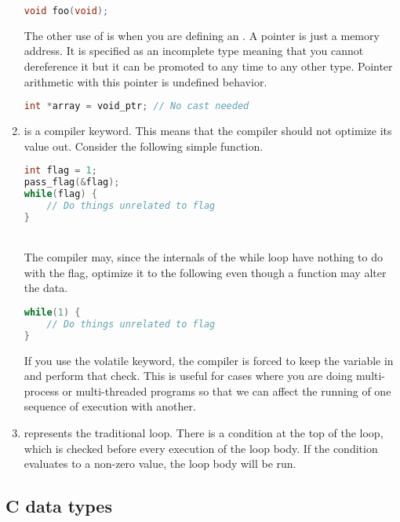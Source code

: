 \begin{enumerate}
	      \begin{lstlisting}[language=C]
void foo(void);
\end{lstlisting}


	      The other use of  is when you are defining an .
        A  pointer is just a memory address. It is specified as an incomplete type meaning that you cannot dereference it but it can be promoted to any time to any other type. Pointer arithmetic with this pointer is undefined behavior.

	      \begin{lstlisting}[language=C]
int *array = void_ptr; // No cast needed
\end{lstlisting}

	    \item {} is a compiler keyword.
        This means that the compiler should not optimize its value out.
        Consider the following simple function.
	      \\
	      \begin{lstlisting}[language=C]
int flag = 1;
pass_flag(&flag);
while(flag) {
    // Do things unrelated to flag
}
\end{lstlisting}
	      \\
	      The compiler may, since the internals of the while loop have nothing to do with the flag, optimize it to the following even though a function may alter the data.
	      \\
	      \begin{lstlisting}[language=C]
while(1) {
    // Do things unrelated to flag
}
\end{lstlisting}
	      If you use the volatile keyword, the compiler is forced to keep the variable in and perform that check. This is useful for cases where you are doing multi-process or multi-threaded programs so that we can affect the running of one sequence of execution with another.
	\item {} represents the traditional  loop. There is a condition at the top of the loop, which is checked before every execution of the loop body. If the condition evaluates to a non-zero value, the loop body will be run.
\end{enumerate}

\subsection{C data types}

